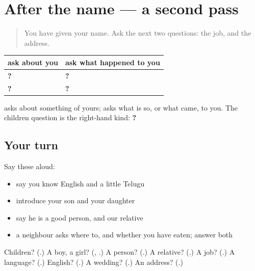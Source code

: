 \section[(dialogue)]{After the name — a second pass}

\label{lesson:TE-R91-second-pass-people}



\begin{quote}
You have given your name. Ask the next two questions: the job, and the address.
\end{quote}

\begin{grammarlens}[title={Grammar Lens: one frame, many questions}]
\noindent
\begin{tabularx}{\linewidth}{@{}>{\raggedright\arraybackslash}X>{\raggedright\arraybackslash}X@{}}
\toprule
\textbf{ask about you} & \textbf{ask what happened to you} \\
\midrule
\textbf{\te{మీ} \te{ఉద్యోగం} \te{ఏమిటి}?} & \textbf{\te{మీకు} \te{పెళ్ళి} \te{అయిందా}?} \\
\textbf{\te{మీ} \te{చిరునామా} \te{ఏమిటి}?} & \textbf{\te{మీకు} \te{ఏ} \te{భాషలు} \te{వచ్చు}?} \\
\bottomrule
\end{tabularx}

\textbf{} asks about something of yours; \textbf{} asks what is so, or what came, to you. The children question is the right-hand kind: \textbf{  ?}
\end{grammarlens}

\subsection*{Your turn}
Say these aloud:

\begin{itemize}
\raggedright
  \item say you know English and a little Telugu
  \item introduce your son and your daughter
  \item say he is a good person, and our relative
  \item a neighbour asks where to, and whether you have eaten; answer both
\end{itemize}

\begin{tcolorbox}[breakable,colback=teal!4,colframe=teal!35!black,title={Before you move on}]
Children? (\textbf{}.) A boy, a girl? (\textbf{}, \textbf{}.) A person? (\textbf{}.) A relative? (\textbf{}.) A job? (\textbf{}.) A language? (\textbf{}.) English? (\textbf{}.) A wedding? (\textbf{}.) An address? (\textbf{}.)
\end{tcolorbox}
